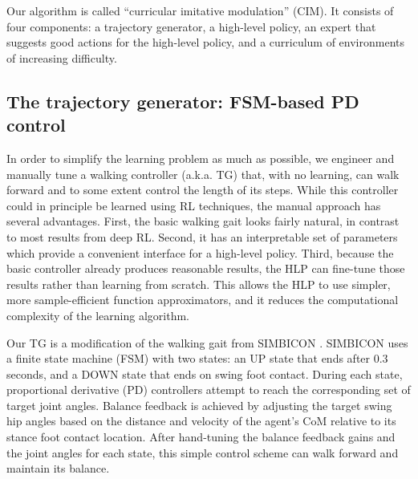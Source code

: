 \documentclass[a4paper]{article}
\begin{document}
Our algorithm is called ``curricular imitative modulation'' (CIM).
It consists of four components: a trajectory generator, a high-level policy, an expert that suggests good actions for the high-level policy, and a curriculum of environments of increasing difficulty.

\subsection{The trajectory generator: FSM-based PD control}

In order to simplify the learning problem as much as possible, we engineer and manually tune a walking controller (a.k.a. TG) that, with no learning, can walk forward and to some extent control the length of its steps.
While this controller could in principle be learned using RL techniques, the manual approach has several advantages.
First, the basic walking gait looks fairly natural, in contrast to most results from deep RL.
Second, it has an interpretable set of parameters which provide a convenient interface for a high-level policy.
Third, because the basic controller already produces reasonable results, the HLP can fine-tune those results rather than learning from scratch.
This allows the HLP to use simpler, more sample-efficient function approximators, and it reduces the computational complexity of the learning algorithm.

Our TG is a modification of the walking gait from SIMBICON \citep{yin2007simbicon}.
SIMBICON uses a finite state machine (FSM) with two states: an UP state that ends after 0.3 seconds, and a DOWN state that ends on swing foot contact.
During each state, proportional derivative (PD) controllers attempt to reach the corresponding set of target joint angles.
Balance feedback is achieved by adjusting the target swing hip angles based on the distance and velocity of the agent's CoM relative to its stance foot contact location.
After hand-tuning the balance feedback gains and the joint angles for each state, this simple control scheme can walk forward and maintain its balance.
\end{document}
